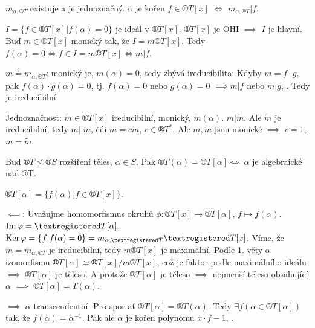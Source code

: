 \documentclass[12pt]{article}                   %
\begin{document}
        \begin{tvrzeni}
            $m_{\alpha, ®T}$ existuje a je jednoznačný. $\alpha$ je kořen $f \in ®T[x]$ $\Leftrightarrow$ $m_{\alpha, ®T} | f$.

            \begin{dukazin}
                $I = \{f \in ®T[x] | f(\alpha) = 0\}$ je ideál v $®T[x]$. $®T[x]$ je OHI $\implies$ $I$ je hlavní. Buď $m \in ®T[x]$ monický tak, že $I = m®T[x]$. Tedy $f(\alpha) = 0 \Leftrightarrow f \in I = m®T[x] \Leftrightarrow m|f$.

                $m \overset{?}{=} m_{\alpha, ®T}$: monický je, $m(\alpha) = 0$, tedy zbývá ireducibilita: Kdyby $m = f·g$, pak $f(\alpha)·g(\alpha) = 0$, tj. $f(\alpha) = 0$ nebo $g(\alpha) = 0$ $\implies m | f$ nebo $m|g$, \lightning. Tedy je ireducibilní.

                Jednoznačnost: $\tilde{m} \in ®T[x]$ ireducibilní, monický, $\tilde{m}(\alpha)$. $m | \tilde{m}$. Ale $\tilde{m}$ je ireducibilní, tedy $m||\tilde{m}$, čili $m = c\tilde{m}$, $c \in ®T^*$. Ale $m, \tilde{m}$ jsou monické $\implies$ $c = 1$, $m = \tilde{m}$.
            \end{dukazin}
        \end{tvrzeni}

        \begin{tvrzeni}
            Buď $®T ≤ ®S$ rozšíření těles, $\alpha \in S$. Pak $®T(\alpha) = ®T[\alpha] \Leftrightarrow$ $\alpha$ je algebraické nad ®T.

            \begin{dukazin}
                $®T[\alpha] = \{f(\alpha) | f \in ®T[x]\}$.

                $\impliedby$: Uvažujme homomorfismus okruhů $\phi: ®T[x] \rightarrow ®T[\alpha]$, $f \mapsto f(\alpha)$. $\im \phi = ®T[\alpha]$. $\Ker \phi = \{f | f(\alpha) = 0\} = m_{\alpha, ®T}®T[x]$. Víme, že $m = m_{\alpha, ®T}$ je ireducibilní, tedy $m®T[x]$ je maximální. Podle 1. věty o izomorfismu $®T[\alpha] \simeq ®T[x] / m®T[x]$, což je faktor podle maximálního ideálu $\implies$ $®T[\alpha]$ je těleso. A protože $®T[\alpha]$ je těleso $\implies$ nejmenší těleso obsahující $\alpha$ $\implies$ $®T[\alpha] = T(\alpha)$.

                $\implies$ $\alpha$ transcendentní. Pro spor ať $®T[\alpha] = ®T(\alpha)$. Tedy $\exists f(\alpha \in ®T[\alpha])$ tak, že $f(\alpha) = \alpha^{-1}$. Pak ale $\alpha$ je kořen polynomu $x·f - 1$, \lightning.
            \end{dukazin}
        \end{tvrzeni}
\end{document}
